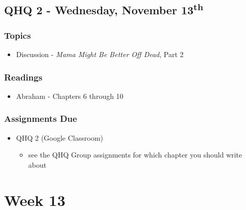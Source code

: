 \documentclass[]{book}
\providecommand{\tightlist}{%
  \setlength{\itemsep}{0pt}\setlength{\parskip}{0pt}}
\begin{document}
\hypertarget{qhq-2---wednesday-november-13th}{%
\subsection*{\texorpdfstring{QHQ 2 - Wednesday, November 13\textsuperscript{th}}{QHQ 2 - Wednesday, November 13th}}\label{qhq-2---wednesday-november-13th}}

\hypertarget{topics-23}{%
\subsubsection*{Topics}\label{topics-23}}

\begin{itemize}
\tightlist
\item
  Discussion - \emph{Mama Might Be Better Off Dead}, Part 2
\end{itemize}

\hypertarget{readings-21}{%
\subsubsection*{Readings}\label{readings-21}}

\begin{itemize}
\tightlist
\item
  Abraham - Chapters 6 through 10
\end{itemize}

\hypertarget{assignments-due-4}{%
\subsubsection*{Assignments Due}\label{assignments-due-4}}

\begin{itemize}
\tightlist
\item
  QHQ 2 (Google Classroom)

  \begin{itemize}
  \tightlist
  \item
    see the QHQ Group assignments for which chapter you should write about
  \end{itemize}
\end{itemize}

\hypertarget{week-13}{%
\section*{Week 13}\label{week-13}}
\end{document}
